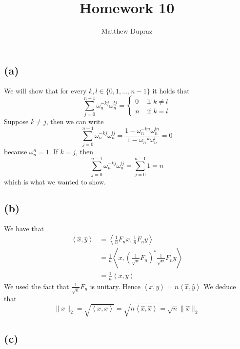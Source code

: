 \documentclass{article}
\author{Matthew Dupraz}
\title{Homework 10}
\newcommand{\inner}[2]{\left\langle #1, #2 \right\rangle}
\begin{document}
\maketitle

\subsection*{(a)}
We will show that for every $k, l  \in \{0, 1, \dots, n-1\}$
it holds that
\begin{equation*}
	\sum_{j=0}^{n-1}\omega_n^{-kj}\omega_n^{lj} = 
	\begin{cases}
		0 & \text{ if } k \neq l\\
		n & \text{ if } k = l
	\end{cases}
\end{equation*}
Suppose $k \neq j$, then we can write
\begin{equation*}
	\sum_{j=0}^{n-1}\omega_n^{-kj}\omega_n^{lj} =
	\frac{1 - \omega_n^{-kn}\omega_n^{ln}}
		{1 - \omega_n^{-k}\omega_n^l} = 0
\end{equation*}
because $\omega_n^n = 1$. If $k = j$, then
\begin{equation*}
	\sum_{j=0}^{n-1}\omega_n^{-kj}\omega_n^{lj} =
	\sum_{j=0}^{n-1}1 = n
\end{equation*}
which is what we wanted to show.

\subsection*{(b)}

We have that
\begin{align*}
	\inner{\hat{x}}{\hat{y}} &= 
	\inner{\frac{1}{n}F_nx}{\frac{1}{n}F_n y}\\
	&= \frac{1}{n}\inner{x}{\left(\frac{1}{\sqrt{n}}F_n\right)^*
	\frac{1}{\sqrt{n}}F_n y}\\
	&= \frac{1}{n}\inner{x}{y}
\end{align*}
We used the fact that $\frac{1}{\sqrt{n}}F_n$ is unitary.
Hence $\inner{x}{y} = n\inner{\hat{x}}{\hat{y}}$
We deduce that 
\begin{equation*}
	\|x\|_2 = \sqrt{\inner{x}{x}} =
	\sqrt{n\inner{\hat{x}}{\hat{x}}}
	= \sqrt{n}\|\hat{x}\|_2
\end{equation*}
	
\subsection*{(c)}
\end{document}
